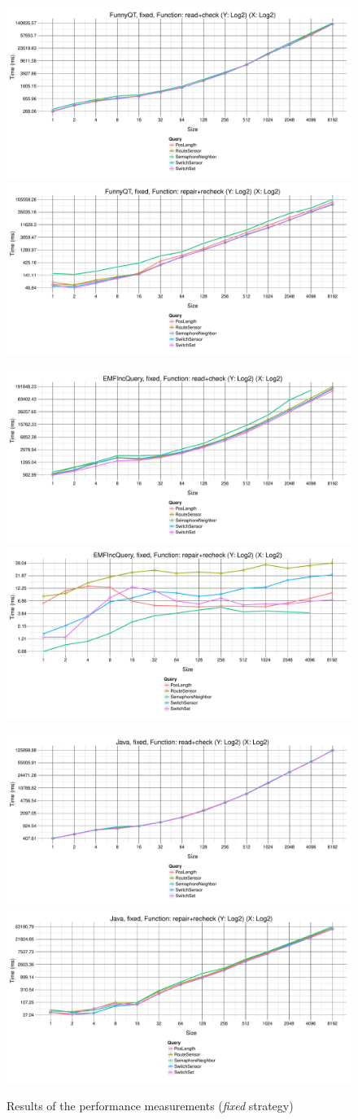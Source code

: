 \documentclass[submission]{eptcs}
\begin{document}
\begin{figure}[h!tb]
  \centering
  \includegraphics[width=.495\textwidth]{perf/fixed-FunnyQT-GroupBy-Query-time-batch-validation}
  \includegraphics[width=.495\textwidth]{perf/fixed-FunnyQT-GroupBy-Query-time-revalidation}

  \includegraphics[width=.495\textwidth]{perf/fixed-EMFIncQuery-GroupBy-Query-time-batch-validation}
  \includegraphics[width=.495\textwidth]{perf/fixed-EMFIncQuery-GroupBy-Query-time-revalidation}

  \includegraphics[width=.495\textwidth]{perf/fixed-Java-GroupBy-Query-time-batch-validation}
  \includegraphics[width=.495\textwidth]{perf/fixed-Java-GroupBy-Query-time-revalidation}

  \caption{Results of the performance measurements (\emph{fixed} strategy)}
  \label{fig:performance-fixed}
\end{figure}
\end{document}
